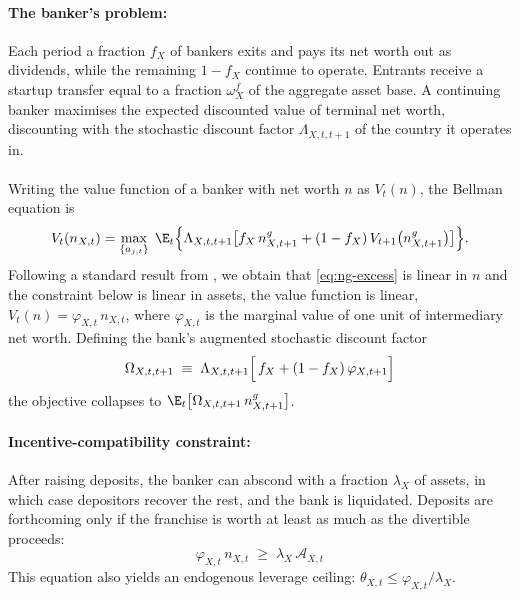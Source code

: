 \paragraph{The banker's problem:} Each period a fraction $f_X$ of bankers exits and pays its net worth out as dividends, while the remaining $1-f_X$ continue to operate. Entrants receive a startup transfer equal to a fraction
$\omega_X^f$ of the aggregate asset base. A continuing banker maximises the expected discounted value of terminal net worth, discounting with the stochastic discount factor $\Lambda_{X,t,t+1}$ of the country it operates in. \\
\\
Writing the value function of a banker with net worth $n$ as $V_t(n)$, the Bellman equation is
\begin{equation}
V_t(n_{X,t})
=\max_{\{a_{j,t}\}}\;
\E_t\Bigl\{\Lambda_{X,t,t+1}\bigl[
   f_X\,n^{g}_{X,t+1}+(1-f_X)\,V_{t+1}\bigl(n^{g}_{X,t+1}\bigr)\bigr]\Bigr\}.
\label{eq:bank-bellman}
\end{equation}
Following a standard result from \cite{gertler2011model}, we obtain that \eqref{eq:ng-excess} is linear in $n$ and the constraint below is linear in assets, the value function is linear, $V_t(n)=\varphi_{X,t}\,n_{X,t}$, where
$\varphi_{X,t}$ is the marginal value of one unit of intermediary net worth. Defining the bank's augmented stochastic
discount factor
\begin{equation}
\;
\Omega_{X,t,t+1}\;\equiv\;\Lambda_{X,t,t+1}\Bigl[\,f_X+(1-f_X)\,\varphi_{X,t+1}\Bigr]\;
\label{eq:omega}
\end{equation}
the objective collapses to $\E_t\bigl[\Omega_{X,t,t+1}\,n^{g}_{X,t+1}\bigr]$.

\paragraph{Incentive-compatibility constraint:} After raising deposits, the banker can abscond with a fraction $\lambda_X$ of assets, in which case depositors recover the rest, and the bank is liquidated. Deposits are forthcoming only if the franchise is worth at least as much as the divertible proceeds:
\begin{equation}
\;\varphi_{X,t}\,n_{X,t}\;\ge\;\lambda_X\,\mathcal{A}_{X,t}\;
\label{eq:IC}
\end{equation}
This equation also yields an endogenous leverage ceiling: $\theta_{X,t}\le\varphi_{X,t}/\lambda_X$.



